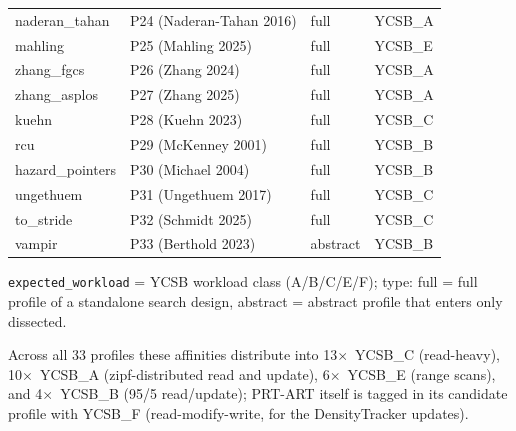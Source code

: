 \begin{nurlang}
\begin{table}[!htbp]
\begin{tabular}{llll}
    naderan\_tahan & P24 (Naderan-Tahan 2016) & full & YCSB\_A \\
    mahling & P25 (Mahling 2025) & full & YCSB\_E \\
    zhang\_fgcs & P26 (Zhang 2024) & full & YCSB\_A \\
    zhang\_asplos & P27 (Zhang 2025) & full & YCSB\_A \\
    kuehn & P28 (Kuehn 2023) & full & YCSB\_C \\
    rcu & P29 (McKenney 2001) & full & YCSB\_B \\
    hazard\_pointers & P30 (Michael 2004) & full & YCSB\_B \\
    ungethuem & P31 (Ungethuem 2017) & full & YCSB\_C \\
    to\_stride & P32 (Schmidt 2025) & full & YCSB\_C \\
    vampir & P33 (Berthold 2023) & abstract & YCSB\_B \\
    \bottomrule
  \end{tabular}

  \smallskip
  {\footnotesize \texttt{expected\_workload} = YCSB workload class (A/B/C/E/F); type: full = full profile of a
  standalone search design, abstract = abstract profile that enters only dissected.\par}
\end{table}
\end{nurlang}

Across all 33 profiles these affinities distribute into 13$\times$~YCSB\_C (read-heavy),
10$\times$~YCSB\_A (zipf-distributed read and update), 6$\times$~YCSB\_E (range scans), and
4$\times$~YCSB\_B (95/5 read/update); PRT-ART itself is tagged in its candidate profile with YCSB\_F
(read-modify-write, for the DensityTracker updates).

